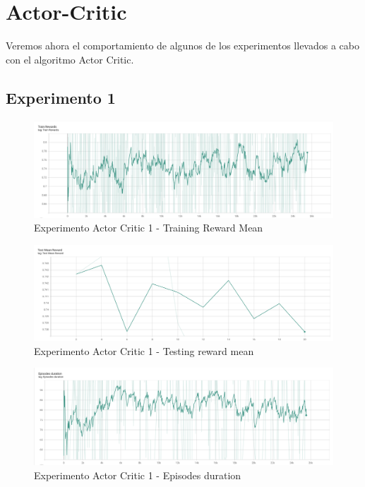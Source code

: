 \section{Actor-Critic}
\label{resultados-actor-critic}

Veremos ahora el comportamiento de algunos de los experimentos llevados a cabo con el algoritmo Actor Critic.
\medskip

\subsection{Experimento 1}
\label{resultados-actor-critic-experimento-1}

\begin{figure}[H]
	\centering
	\includegraphics[width=1\textwidth]{figuras/experiments/actor_critic/actor_critic_20_epochs/train_rewards.png}
	\caption[Experimento Actor Critic 1 - Training Reward Mean]{Experimento Actor Critic 1 - Training Reward Mean}
	\label{fig-experimento-actor-critic-1-training-reward-mean}
\end{figure}
\begin{figure}[H]
	\centering
	\includegraphics[width=1\textwidth]{figuras/experiments/actor_critic/actor_critic_20_epochs/test_mean_reward.png}
	\caption[Experimento Actor Critic 1 - Testing reward mean]{Experimento Actor Critic 1 - Testing reward mean}
	\label{fig-experimento-actor-critic-1-testing-reward-mean}
\end{figure}
\begin{figure}[H]
	\centering
	\includegraphics[width=1\textwidth]{figuras/experiments/actor_critic/actor_critic_20_epochs/episodes_duration.png}
	\caption[Experimento Actor Critic 1 - Episodes duration]{Experimento Actor Critic 1 - Episodes duration}
	\label{fig-experimento-actor-critic-1-episodes-duration}
\end{figure}

